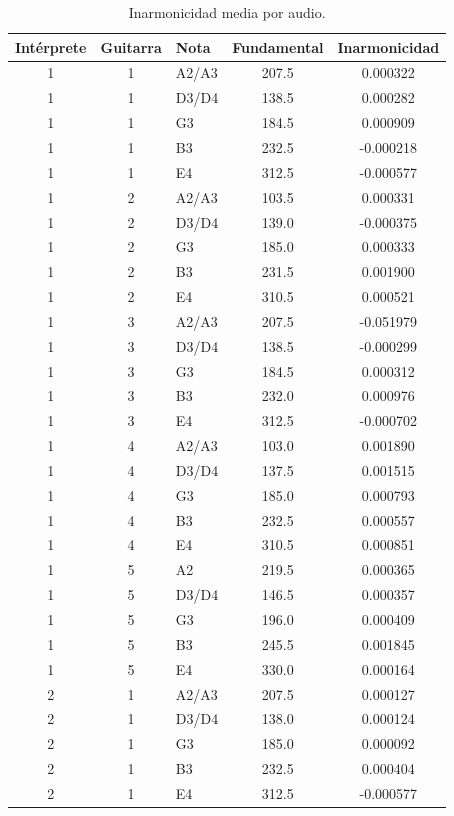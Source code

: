 \begin{table}[htbp]
  \centering
 \small
  \caption{Inarmonicidad media por audio.}
  \label{tab:resumen}
  \begin{tabular}{cclcc}
  \toprule
  Intérprete & Guitarra & Nota & Fundamental & Inarmonicidad \\
  \midrule
  1 & 1 & A2/A3 & 207.5 & 0.000322 \\
  1 & 1 & D3/D4 & 138.5 & 0.000282 \\
  1 & 1 & G3 & 184.5 & 0.000909 \\
  1 & 1 & B3 & 232.5 & -0.000218 \\
  1 & 1 & E4 & 312.5 & -0.000577 \\
  1 & 2 & A2/A3 & 103.5 & 0.000331 \\
  1 & 2 & D3/D4 & 139.0 & -0.000375 \\
  1 & 2 & G3 & 185.0 & 0.000333 \\
  1 & 2 & B3 & 231.5 & 0.001900 \\
  1 & 2 & E4 & 310.5 & 0.000521 \\
  1 & 3 & A2/A3 & 207.5 & -0.051979 \\
  1 & 3 & D3/D4 & 138.5 & -0.000299 \\
  1 & 3 & G3 & 184.5 & 0.000312 \\
  1 & 3 & B3 & 232.0 & 0.000976 \\
  1 & 3 & E4 & 312.5 & -0.000702 \\
  1 & 4 & A2/A3 & 103.0 & 0.001890 \\
  1 & 4 & D3/D4 & 137.5 & 0.001515 \\
  1 & 4 & G3 & 185.0 & 0.000793 \\
  1 & 4 & B3 & 232.5 & 0.000557 \\
  1 & 4 & E4 & 310.5 & 0.000851 \\
  1 & 5 & A2 & 219.5 & 0.000365 \\
  1 & 5 & D3/D4 & 146.5 & 0.000357 \\
  1 & 5 & G3 & 196.0 & 0.000409 \\
  1 & 5 & B3 & 245.5 & 0.001845 \\
  1 & 5 & E4 & 330.0 & 0.000164 \\
  2 & 1 & A2/A3 & 207.5 & 0.000127 \\
  2 & 1 & D3/D4 & 138.0 & 0.000124 \\
  2 & 1 & G3 & 185.0 & 0.000092 \\
  2 & 1 & B3 & 232.5 & 0.000404 \\
  2 & 1 & E4 & 312.5 & -0.000577 \\

\end{tabular}
\end{table}
